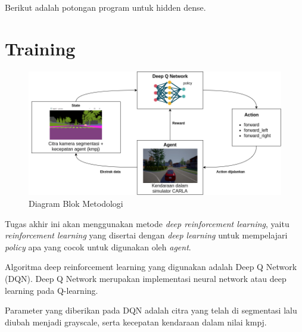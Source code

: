 Berikut adalah potongan program untuk hidden dense.



\section{Training}
\label{sec:training}

\begin{figure}[H] 
	\centering
	\includegraphics[width=1\linewidth]{images/metodologi}
	\caption{Diagram Blok Metodologi}
	\label{fig:blockdiagram}
\end{figure}
Tugas akhir ini akan menggunakan metode \textit{deep reinforcement learning}, yaitu \textit{reinforcement learning }yang disertai dengan \textit{deep learning }untuk mempelajari \textit{policy }apa yang cocok untuk digunakan oleh \textit{agent}. 

Algoritma deep reinforcement learning yang digunakan adalah Deep Q Network (DQN). Deep Q Network merupakan implementasi neural network atau deep learning pada Q-learning.

Parameter yang diberikan pada DQN adalah citra yang telah di segmentasi lalu diubah menjadi grayscale, serta kecepatan kendaraan dalam nilai kmpj.

